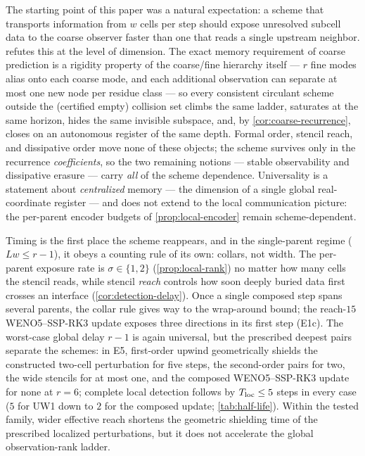 \documentclass[pdflatex,sn-mathphys-num]{sn-jnl}%
\theoremstyle{thmstyleone}%
\theoremstyle{thmstyletwo}%
\theoremstyle{thmstylethree}%
\begin{document}
The starting point of this paper was a natural expectation: a scheme that transports information from $w$ cells per step should expose unresolved subcell data to the coarse observer faster than one that reads a single upstream neighbor.
 refutes this at the level of dimension.
The exact memory requirement of coarse prediction is a rigidity property of the coarse/fine hierarchy itself --- $r$ fine modes alias onto each coarse mode, and each additional observation can separate at most one new node per residue class --- so every consistent circulant scheme outside the (certified empty) collision set climbs the same ladder, saturates at the same horizon, hides the same invisible subspace, and, by \cref{cor:coarse-recurrence}, closes on an autonomous register of the same depth.
Formal order, stencil reach, and dissipative order move none of these objects; the scheme survives only in the recurrence \emph{coefficients}, so the two remaining notions --- stable observability and dissipative erasure --- carry \emph{all} of the scheme dependence.
Universality is a statement about \emph{centralized} memory --- the dimension of a single global real-coordinate register --- and does not extend to the local communication picture: the per-parent encoder budgets of \cref{prop:local-encoder} remain scheme-dependent.

Timing is the first place the scheme reappears, and in the single-parent regime ($Lw\le r-1$), it obeys a counting rule of its own: collars, not width.
The per-parent exposure rate is $\sigma\in\{1,2\}$ (\cref{prop:local-rank}) no matter how many cells the stencil reads, while stencil \emph{reach} controls how soon deeply buried data first crosses an interface (\cref{cor:detection-delay}).
Once a single composed step spans several parents, the collar rule gives way to the wrap-around bound; the reach-$15$ WENO5--SSP-RK3 update exposes three directions in its first step (E1c).
The worst-case global delay $r-1$ is again universal, but the prescribed deepest pairs separate the schemes: in E5, first-order upwind geometrically shields the constructed two-cell perturbation for five steps, the second-order pairs for two, the wide stencils for at most one, and the composed WENO5--SSP-RK3 update for none at $r=6$; complete local detection follows by $T_{\rm loc}\le5$ steps in every case ($5$ for UW1 down to $2$ for the composed update; \cref{tab:half-life}).
Within the tested family, wider effective reach shortens the geometric shielding time of the prescribed localized perturbations, but it does not accelerate the global observation-rank ladder.
\end{document}
